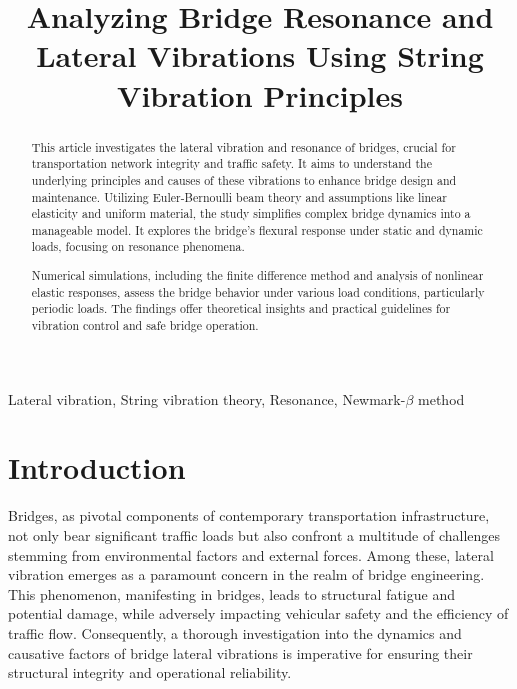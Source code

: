 \documentclass[conference]{IEEEtran}
\begin{document}
\title{\LARGE Analyzing Bridge Resonance and Lateral Vibrations Using String Vibration Principles}

 \author{
 }

\maketitle

\begin{abstract}

This article investigates the lateral vibration and resonance of bridges, crucial for transportation network integrity and traffic safety. It aims to understand the underlying principles and causes of these vibrations to enhance bridge design and maintenance. Utilizing Euler-Bernoulli beam theory and assumptions like linear elasticity and uniform material, the study simplifies complex bridge dynamics into a manageable model. It explores the bridge's flexural response under static and dynamic loads, focusing on resonance phenomena.

Numerical simulations, including the finite difference method and analysis of nonlinear elastic responses, assess the bridge behavior under various load conditions, particularly periodic loads. The findings offer theoretical insights and practical guidelines for vibration control and safe bridge operation.
\end{abstract}

\IEEEoverridecommandlockouts
\begin{keywords}
Lateral vibration, String vibration theory, Resonance, Newmark-$\beta{}$ method
\end{keywords}

\IEEEpeerreviewmaketitle




\section{Introduction}

Bridges, as pivotal components of contemporary transportation infrastructure, not only bear significant traffic loads but also confront a multitude of challenges stemming from environmental factors and external forces. Among these, lateral vibration emerges as a paramount concern in the realm of bridge engineering.\cite{chen2020multimode} This phenomenon, manifesting in bridges, leads to structural fatigue and potential damage, while adversely impacting vehicular safety and the efficiency of traffic flow. Consequently, a thorough investigation into the dynamics and causative factors of bridge lateral vibrations is imperative for ensuring their structural integrity and operational reliability.\cite{wei2022lateral}
\end{document}
